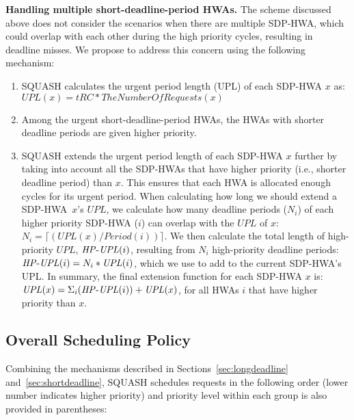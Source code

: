 \documentclass[10pt,letterpaper]{article}
\newcommand{\sdphwa}[0]{SDP-HWA\xspace}
\begin{document}
\noindent\textbf{Handling multiple short-deadline-period HWAs.}
The scheme discussed above does not consider the scenarios when there are
multiple \sdphwa, which could overlap with each other during the high priority
cycles, resulting in deadline misses.
We propose to address this concern using the following
mechanism:

\begin{enumerate}

\item
SQUASH calculates the urgent period length (UPL) of each SDP-HWA $x$ as: \\
$\mathit{UPL}(x) = tRC*TheNumberOfRequests(x)$

\item
Among the urgent short-deadline-period HWAs, the HWAs with shorter
deadline periods are given higher priority.

\item SQUASH extends the urgent period length of each SDP-HWA $x$ further by
taking into account all the SDP-HWAs that have higher priority (i.e., shorter
deadline period) than $x$. This ensures that each HWA is allocated enough
cycles for its urgent period. When calculating how long we should extend a
\mbox{SDP-HWA $x$'s} $\mathit{UPL}$, we calculate how many deadline periods ($N_i$)
of each higher priority \mbox{SDP-HWA} ($i$) can overlap with the $\mathit{UPL}$
of $x$: $N_i = \lceil(\mathit{UPL}(x)/Period(i))\rceil$. We then calculate the
total length of high-priority $\mathit{UPL}$, $\mathit{HP\mathchar`-UPL}(i)$,
resulting from $N_i$ high-priority deadline periods:
$\mathit{HP\mathchar`-UPL}(i) = N_i * \mathit{UPL}(i)$, which we use to add to
the current SDP-HWA's UPL. In summary, the final extension function for each
SDP-HWA $x$ is: $\mathit{UPL}(x) = \Sigma_i (\mathit{HP\mathchar`-UPL}(i)) +
\mathit{UPL}(x)$, for all HWAs $i$ that have higher priority than $x$.



\end{enumerate}

\subsection{Overall Scheduling Policy}
\label{sec:overall-scheduling} Combining the mechanisms described in
Sections~\ref{sec:longdeadline} and~\ref{sec:shortdeadline}, SQUASH schedules
requests in the following order (lower number indicates higher priority) and
priority level within each group is also provided in parentheses:
\end{document}
